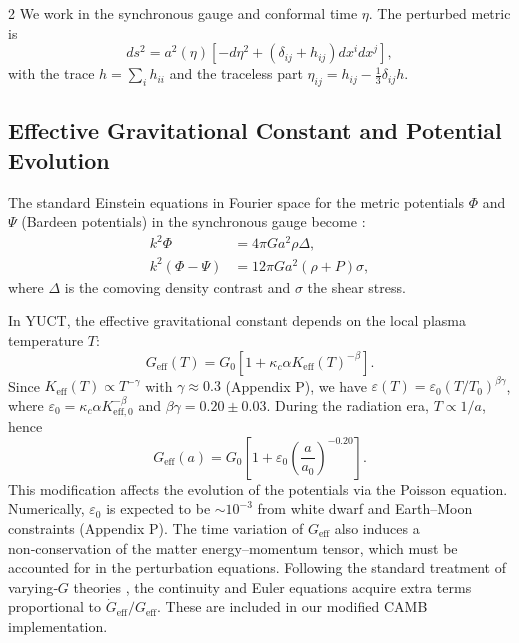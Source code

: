 \documentclass[11pt,a4paper]{article}
\begin{document}
\begin{multicols}{2}
		We work in the synchronous gauge and conformal time $\eta$. The perturbed metric is
		\begin{equation}
			ds^2 = a^2(\eta)\left[ -d\eta^2 + (\delta_{ij} + h_{ij}) dx^i dx^j \right],
		\end{equation}
		with the trace $h = \sum_i h_{ii}$ and the traceless part $\eta_{ij} = h_{ij} - \frac{1}{3}\delta_{ij}h$.
		
		\subsection{Effective Gravitational Constant and Potential Evolution}
		
		The standard Einstein equations in Fourier space for the metric potentials $\Phi$ and $\Psi$ (Bardeen potentials) in the synchronous gauge become \cite{Ma1995}:
		\begin{align}
			k^2 \Phi &= 4\pi G a^2 \rho \Delta, \\
			k^2 (\Phi - \Psi) &= 12\pi G a^2 (\rho+P) \sigma,
		\end{align}
		where $\Delta$ is the comoving density contrast and $\sigma$ the shear stress.
		
		In YUCT, the effective gravitational constant depends on the local plasma temperature $T$:
		\begin{equation}
			G_{\mathrm{eff}}(T) = G_0\left[1 + \kappa_c \alpha K_{\mathrm{eff}}(T)^{-\beta}\right].
			\label{eq:Geff}
		\end{equation}
		Since $K_{\mathrm{eff}}(T) \propto T^{-\gamma}$ with $\gamma \approx 0.3$ (Appendix P), we have $\varepsilon(T) = \varepsilon_0 (T/T_0)^{\beta\gamma}$, where $\varepsilon_0 = \kappa_c \alpha K_{\mathrm{eff},0}^{-\beta}$ and $\beta\gamma = 0.20 \pm 0.03$. During the radiation era, $T \propto 1/a$, hence
		\begin{equation}
			G_{\mathrm{eff}}(a) = G_0\left[1 + \varepsilon_0 \left(\frac{a}{a_0}\right)^{-0.20}\right].
			\label{eq:Geff_a}
		\end{equation}
		This modification affects the evolution of the potentials via the Poisson equation. Numerically, $\varepsilon_0$ is expected to be $\sim 10^{-3}$ from white dwarf and Earth--Moon constraints (Appendix P). The time variation of $G_{\mathrm{eff}}$ also induces a non‑conservation of the matter energy--momentum tensor, which must be accounted for in the perturbation equations. Following the standard treatment of varying‑$G$ theories \cite{Uzan2011}, the continuity and Euler equations acquire extra terms proportional to $\dot{G}_{\mathrm{eff}}/G_{\mathrm{eff}}$. These are included in our modified CAMB implementation.
		

\end{multicols}
\end{document}
